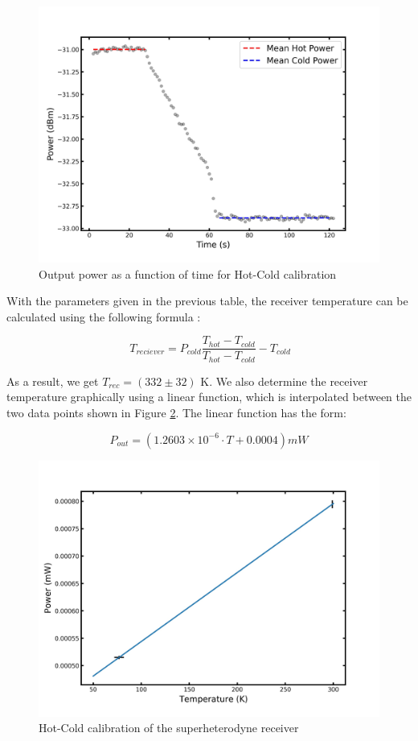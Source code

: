 \documentclass[12pt]{article}
\begin{document}
\begin{figure}[H]
\centering
\includegraphics[scale=.5]{fig/Exercise_5_1.jpg}
\caption{Output power as a function of time for Hot-Cold calibration}
\label{fig1.51}
\end{figure}

With the parameters given in the previous table, the receiver temperature can be calculated using the following formula \cite{radiometereq}:

\begin{equation}
\ T_{reciever} = P_{cold}\dfrac{T_{hot} - T_{cold}}{T_{hot} - T_{cold}} - T_{cold}
\end{equation}

As a result, we get $T_{rec} = (332 \pm 32)$ K. We also determine the receiver temperature graphically using a linear function, which is interpolated between the two data points shown in Figure \ref{fig1.52}. The linear function has the form:

\begin{equation}
    P_{out} = (1.2603 \times 10^{-6} \cdot T  + 0.0004) mW
\end{equation}

\begin{figure}[H]
\centering
\includegraphics[scale=.5]{fig/Exercise_5_2.jpg}
\caption{Hot-Cold calibration of the superheterodyne receiver}
\label{fig1.52}
\end{figure}
\end{document}
